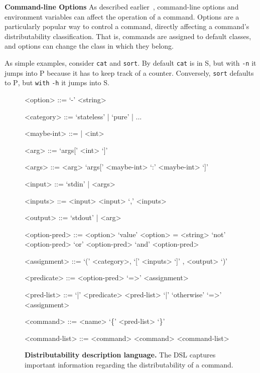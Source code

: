 \documentclass[sigplan,10pt,review,anonymous]{acmart}
\newcommand{\heading}[1]{\vspace{4pt}\noindent\textbf{#1}\enspace}
\newcommand{\ttt}[1]{\texttt{\small #1}}
\newcommand{\cn}[1]{\mbox{\textcircled{\footnotesize #1}}}
\newcommand{\pur}{\cn{\textsc{P}}\xspace}
\newcommand{\sta}{\cn{\textsc{S}}\xspace}
\begin{document}
\heading{Command-line Options}
As described earlier~, com\-mand-line options and environment variables can affect the operation of a command.
Options are a particularly popular way to control a command, 
  directly affecting a command's distributability classification.
That is, commands are assigned to default classes, and options can change the class in which they belong.

As simple examples, consider \ttt{cat} and \ttt{sort}.
By default \ttt{cat} is in \sta, but with \ttt{-n} it jumps into \pur because it has to keep track of a counter.
Conversely, \ttt{sort} defaults to \pur, but \ttt{with} \ttt{-h} it jumps into \sta.


\begin{figure}
  \centering
  \begin{grammar}
    <option> ::= `-' <string>

    <category> ::= `stateless' | `pure' | ...

    <maybe-int> ::= | <int>

    <arg> ::= `args[' <int> `]'

    <args> ::= <arg>
    \alt `args[' <maybe-int> `:' <maybe-int> `]'

    <input> ::= `stdin' | <args>

    <inputs> ::= <input>
    \alt <input> `,' <inputs>

    <output> ::= `stdout' | <arg>

    <option-pred> ::= <option>
    \alt `value' <option> = <string>
    \alt `not' <option-pred>
     `or' <option-pred>
     `and' <option-pred>

    <assignment> ::= `(' <category>, `[' <inputs> `]' , <output> `)'

    <predicate> ::= <option-pred> `=>' <assignment>

    <pred-list> ::= `|' <predicate> <pred-list>
    \alt `|' `otherwise' `=>' <assignment>

    <command> ::= <name> `\{' <pred-list> `\}'

    <command-list> ::= <command>
    \alt <command> <command-list>
  \end{grammar}
  \caption{
\textbf{Distributability description language.}
The DSL captures important information regarding the distributability of a command.
\vspace{-20pt}
}

  \label{fig:dsl}
\end{figure}
\end{document}
